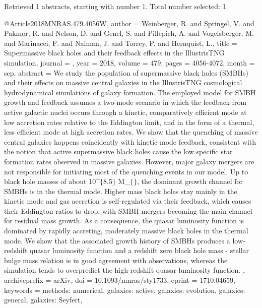 \documentclass[longauth]{aa}
\begin{document}
{{{{Retrieved 1 abstracts, starting with number 1.  Total number selected: 1.

@Article{2018MNRAS.479.4056W,
  author        = {Weinberger, R. and Springel, V. and Pakmor, R. and Nelson, D. and Genel, S. and Pillepich, A. and Vogelsberger, M. and Marinacci, F. and Naiman, J. and Torrey, P. and Hernquist, L.},
  title         = {Supermassive black holes and their feedback effects in the IllustrisTNG simulation},
  journal       = {\mnras},
  year          = {2018},
  volume        = {479},
  pages         = {4056-4072},
  month         = sep,
  abstract      = {We study the population of supermassive black holes (SMBHs) and their
effects on massive central galaxies in the IllustrisTNG cosmological
hydrodynamical simulations of galaxy formation. The employed model for
SMBH growth and feedback assumes a two-mode scenario in which the
feedback from active galactic nuclei occurs through a kinetic,
comparatively efficient mode at low accretion rates relative to the
Eddington limit, and in the form of a thermal, less efficient mode at
high accretion rates. We show that the quenching of massive central
galaxies happens coincidently with kinetic-mode feedback, consistent
with the notion that active supermassive black holes cause the low
specific star formation rates observed in massive galaxies. However,
major galaxy mergers are not responsible for initiating most of the
quenching events in our model. Up to black hole masses of about 10\^{}$\{$8.5$\}$
M\_$\{${\sun}$\}$, the dominant growth channel for SMBHs is in the thermal mode.
Higher mass black holes stay mainly in the kinetic mode and gas
accretion is self-regulated via their feedback, which causes their
Eddington ratios to drop, with SMBH mergers becoming the main channel
for residual mass growth. As a consequence, the quasar luminosity
function is dominated by rapidly accreting, moderately massive black
holes in the thermal mode. We show that the associated growth history of
SMBHs produces a low-redshift quasar luminosity function and a redshift
zero black hole mass - stellar bulge mass relation is in good agreement
with observations, whereas the simulation tends to overpredict the
high-redshift quasar luminosity function.
},
  archiveprefix = {arXiv},
  doi           = {10.1093/mnras/sty1733},
  eprint        = {1710.04659},
  keywords      = {methods: numerical, galaxies: active, galaxies: evolution, galaxies: general, galaxies: Seyfert},
}

}}}}
\end{document}
